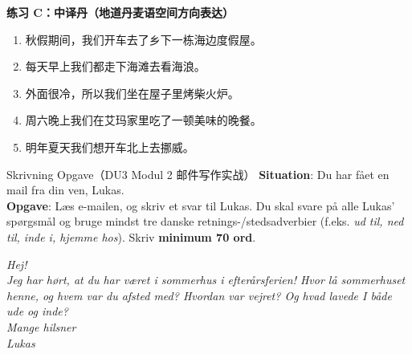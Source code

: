 \textbf{练习 C：中译丹（地道丹麦语空间方向表达）}
\begin{enumerate}
  \item 秋假期间，我们开车去了乡下一栋海边度假屋。
  \item 每天早上我们都走下海滩去看海浪。
  \item 外面很冷，所以我们坐在屋子里烤柴火炉。
  \item 周六晚上我们在艾玛家里吃了一顿美味的晚餐。
  \item 明年夏天我们想开车北上去挪威。
\end{enumerate}


\begin{emailbox}{Skrivning Opgave（DU3 Modul 2 邮件写作实战）}
\textbf{Situation}: Du har fået en mail fra din ven, Lukas.\\
\textbf{Opgave}: Læs e-mailen, og skriv et svar til Lukas. Du skal svare på alle Lukas’ spørgsmål og bruge mindst tre danske retnings-/stedsadverbier (f.eks. \textit{ud til, ned til, inde i, hjemme hos}). Skriv \textbf{minimum 70 ord}.

\vspace{0.3em}
\textit{Hej!\\
Jeg har hørt, at du har været i sommerhus i efterårsferien! Hvor lå sommerhuset henne, og hvem var du afsted med? Hvordan var vejret? Og hvad lavede I både ude og inde?\\
Mange hilsner\\
Lukas}
\end{emailbox}

